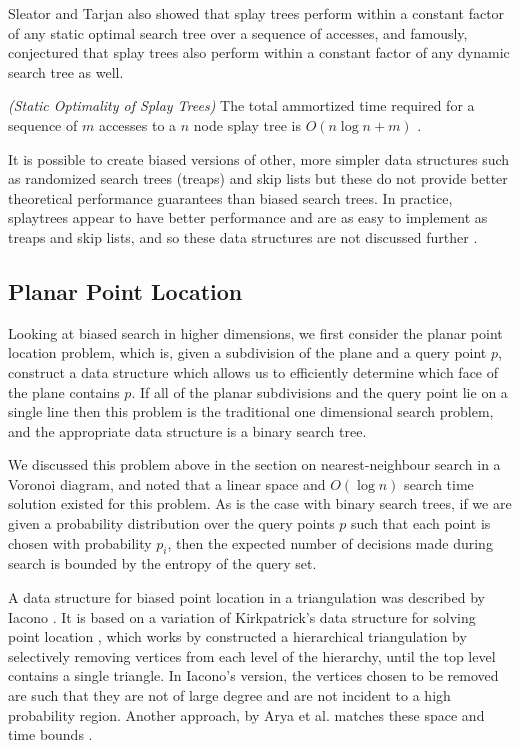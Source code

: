 \documentclass[mcs]{scsthesis}
\begin{document}
Sleator and Tarjan also showed that splay trees perform within a constant
factor of any static optimal search tree over a sequence of accesses, and
famously, conjectured that splay trees also perform within a constant factor
of any dynamic search tree as well.

\begin{thm} \emph{(Static Optimality of Splay Trees)} 
The total ammortized time required for a sequence of \(m\) accesses to a \(n\)
node splay tree is \(O(n \log n + m)\) \cite{splaytree}.
\end{thm}

It is possible to create biased versions of other, more simpler data structures
such as randomized search trees (treaps) \cite{treap} and skip lists
\cite{bsl2} but these do not provide better theoretical performance guarantees
than biased search trees. In practice, splaytrees appear to have better
performance and are as easy to implement as treaps and skip lists, and so these
data structures are not discussed further \cite{minor}.

\subsection{Planar Point Location}

Looking at biased search in higher dimensions, we first consider the planar
point location problem, which is, given a subdivision of the plane and a
query point \(p\), construct a data structure which allows us to efficiently
determine which face of the plane contains \(p\). If all of the planar
subdivisions and the query point lie on a single line then this problem is the
traditional one dimensional search problem, and the appropriate data structure
is a binary search tree.

We discussed this problem above in the section on nearest-neighbour
search in a Voronoi diagram, and noted that a linear space and \(O(\log n)\)
search time solution existed for this problem.  As is the case with binary
search trees, if we are given a probability distribution over the query points
\(p\) such that each point is chosen with probability \(p_i\), then the
expected number of decisions made during search is bounded by the entropy of
the query set.

A data structure for biased point location in a triangulation was described
by Iacono \cite{iacono}. It is based on a variation of Kirkpatrick's data
structure for solving point location \cite{kirkpatrick}, which works by
constructed a hierarchical triangulation by selectively removing vertices
from each level of the hierarchy, until the top level contains a single triangle.
In Iacono's version, the vertices chosen to be removed are such that they are
not of large degree and are not incident to a high probability region. Another
approach, by Arya et al. matches these space and time bounds \cite{simpleentropy}.
\end{document}
